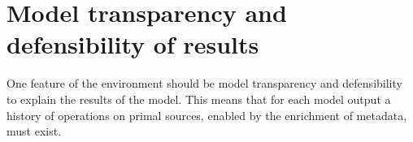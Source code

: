 \section{Model transparency and defensibility of results}

One feature of the environment should be model transparency and defensibility  to explain the results of the model. This means that for each model output a history of operations on primal sources, enabled by the enrichment of metadata, must exist.